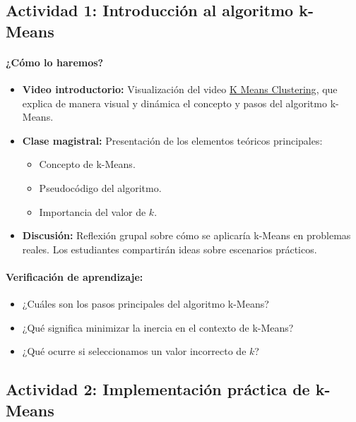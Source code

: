 \documentclass[a4,11pt]{aleph-notas}
\begin{document}
\subsection*{Actividad 1: Introducción al algoritmo k-Means}

\paragraph{¿Cómo lo haremos?}  
\begin{itemize}[leftmargin=*]
    \item \textbf{Video introductorio:} 
    Visualización del video \href{https://youtu.be/2kfY0R34Dy0?si=60bbeVyyJ1g7WX63}{K Means Clustering}, que explica de manera visual y dinámica el concepto y pasos del algoritmo k-Means.
    \item \textbf{Clase magistral:} 
    Presentación de los elementos teóricos principales:
    \begin{itemize}
        \item Concepto de k-Means.
        \item Pseudocódigo del algoritmo.
        \item Importancia del valor de \(k\).
    \end{itemize}
    \item \textbf{Discusión:}
    Reflexión grupal sobre cómo se aplicaría k-Means en problemas reales. Los estudiantes compartirán ideas sobre escenarios prácticos.
\end{itemize}

\paragraph{Verificación de aprendizaje:}  
\begin{itemize}[leftmargin=*]
    \item ¿Cuáles son los pasos principales del algoritmo k-Means?
    \item ¿Qué significa minimizar la inercia en el contexto de k-Means?
    \item ¿Qué ocurre si seleccionamos un valor incorrecto de \(k\)?
\end{itemize}

\subsection*{Actividad 2: Implementación práctica de k-Means}
\end{document}
